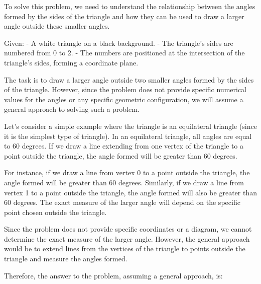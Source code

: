 To solve this problem, we need to understand the relationship between the angles formed by the sides of the triangle and how they can be used to draw a larger angle outside these smaller angles.

Given:
- A white triangle on a black background.
- The triangle's sides are numbered from 0 to 2.
- The numbers are positioned at the intersection of the triangle's sides, forming a coordinate plane.

The task is to draw a larger angle outside two smaller angles formed by the sides of the triangle. However, since the problem does not provide specific numerical values for the angles or any specific geometric configuration, we will assume a general approach to solving such a problem.

Let's consider a simple example where the triangle is an equilateral triangle (since it is the simplest type of triangle). In an equilateral triangle, all angles are equal to 60 degrees. If we draw a line extending from one vertex of the triangle to a point outside the triangle, the angle formed will be greater than 60 degrees.

For instance, if we draw a line from vertex 0 to a point outside the triangle, the angle formed will be greater than 60 degrees. Similarly, if we draw a line from vertex 1 to a point outside the triangle, the angle formed will also be greater than 60 degrees. The exact measure of the larger angle will depend on the specific point chosen outside the triangle.

Since the problem does not provide specific coordinates or a diagram, we cannot determine the exact measure of the larger angle. However, the general approach would be to extend lines from the vertices of the triangle to points outside the triangle and measure the angles formed.

Therefore, the answer to the problem, assuming a general approach, is:

